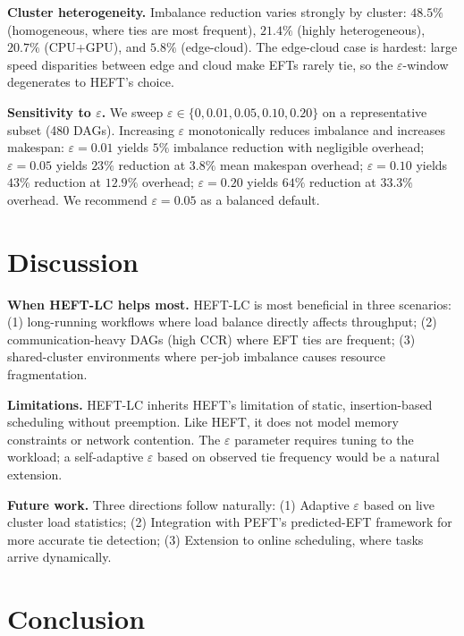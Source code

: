 \documentclass[conference]{IEEEtran}
\begin{document}
\textbf{Cluster heterogeneity.} Imbalance reduction varies strongly by
cluster: $48.5\%$ (homogeneous, where ties are most frequent),
$21.4\%$ (highly heterogeneous), $20.7\%$ (CPU+GPU), and $5.8\%$
(edge-cloud). The edge-cloud case is hardest: large speed disparities
between edge and cloud make EFTs rarely tie, so the $\varepsilon$-window
degenerates to HEFT's choice.

\textbf{Sensitivity to $\varepsilon$.} We sweep
$\varepsilon \in \{0, 0.01, 0.05, 0.10, 0.20\}$ on a representative
subset (480 DAGs). Increasing $\varepsilon$ monotonically reduces
imbalance and increases makespan:
$\varepsilon{=}0.01$ yields $5\%$ imbalance reduction with negligible
overhead;
$\varepsilon{=}0.05$ yields $23\%$ reduction at $3.8\%$ mean
makespan overhead;
$\varepsilon{=}0.10$ yields $43\%$ reduction at $12.9\%$ overhead;
$\varepsilon{=}0.20$ yields $64\%$ reduction at $33.3\%$ overhead.
We recommend $\varepsilon = 0.05$ as a balanced default.

\section{Discussion}

\textbf{When HEFT-LC helps most.}
HEFT-LC is most beneficial in three scenarios:
(1) long-running workflows where load balance directly affects
throughput; (2) communication-heavy DAGs (high CCR) where EFT ties
are frequent; (3) shared-cluster environments where per-job imbalance
causes resource fragmentation.

\textbf{Limitations.}
HEFT-LC inherits HEFT's limitation of static, insertion-based scheduling
without preemption. Like HEFT, it does not model memory constraints or
network contention. The $\varepsilon$ parameter requires tuning to the
workload; a self-adaptive $\varepsilon$ based on observed tie frequency
would be a natural extension.

\textbf{Future work.}
Three directions follow naturally:
(1) Adaptive $\varepsilon$ based on live cluster load statistics;
(2) Integration with PEFT's predicted-EFT framework for more accurate
    tie detection;
(3) Extension to online scheduling, where tasks arrive dynamically.

\section{Conclusion}
\end{document}
